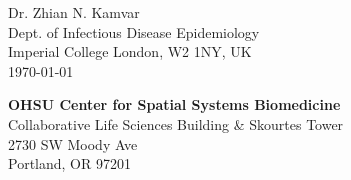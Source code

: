 


\clearpage
\begin{flushright}
  Dr. Zhian N. Kamvar\\
  Dept. of Infectious Disease Epidemiology\\
  Imperial College London, W2 1NY, UK\\
  \today
\end{flushright}

\textbf{OHSU Center for Spatial Systems Biomedicine}\\
Collaborative Life Sciences Building \& Skourtes Tower\\
2730 SW Moody Ave\\
Portland, OR 97201

%




